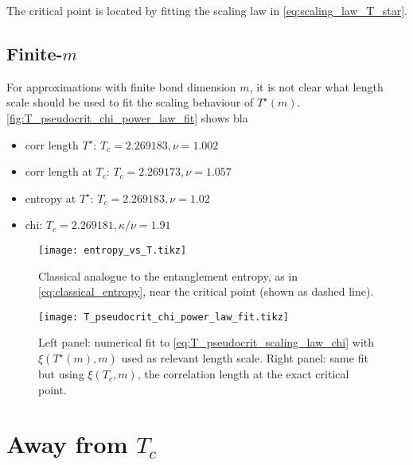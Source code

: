 The critical point is located by fitting the scaling law in \autoref{eq:scaling_law_T_star}.

\subsection{Finite-$m$}
For approximations with finite bond dimension $m$, it is not clear what length scale should be used to fit the scaling
behaviour of $T^{\star}(m)$. \autoref{fig:T_pseudocrit_chi_power_law_fit} shows bla

\begin{itemize}
  \item corr length $T^{\star}$: $T_c = 2.269183, \nu = 1.002$
  \item corr length at $T_c$: $T_c = 2.269173, \nu = 1.057$
  \item entropy at $T^{\star}$: $T_c = 2.269183, \nu = 1.02$
  \item chi: $T_c = 2.269181, \kappa/\nu = 1.91$
\end{itemize}

\begin{figure}
  \texttt{[image: entropy\_vs\_T.tikz]}
  \caption{Classical analogue to the entanglement entropy, as in \autoref{eq:classical_entropy},
  near the critical point (shown as dashed line).}\label{fig:entropy_vs_T}
\end{figure}

\begin{figure}
  \texttt{[image: T\_pseudocrit\_chi\_power\_law\_fit.tikz]}
  \caption{Left panel: numerical fit to \autoref{eq:T_pseudocrit_scaling_law_chi} with $\xi(T^{\star}(m), m)$ used as
  relevant length scale. Right panel: same fit but using $\xi(T_c, m)$, the correlation length at the exact critical
  point.}\label{fig:T_pseudocrit_chi_power_law_fit}
\end{figure}






\section{Away from $T_c$}
